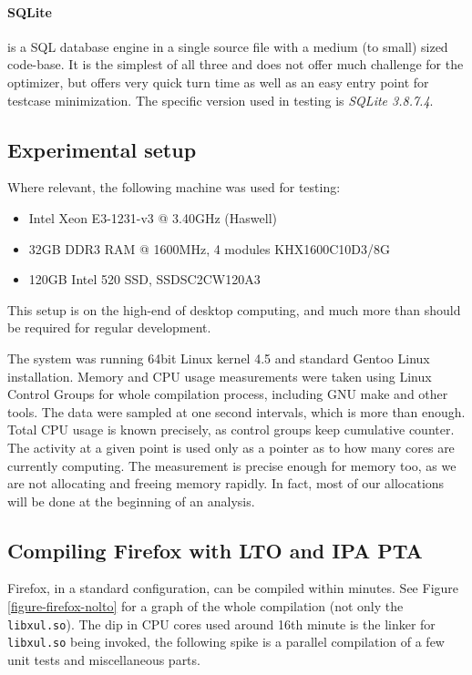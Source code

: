 \paragraph{SQLite} is a SQL database engine in a single source file with a
medium (to small) sized code-base. It is the simplest of all three and does not
offer much challenge for the optimizer, but offers very quick turn time as well
as an easy entry point for testcase minimization. The specific version used in
testing is {\it SQLite 3.8.7.4}.

\subsection{Experimental setup}

Where relevant, the following machine was used for testing:

\begin{itemize}
	\item Intel Xeon E3-1231-v3 @ 3.40GHz (Haswell)
	\item 32GB DDR3 RAM @ 1600MHz, 4 modules KHX1600C10D3/8G
	\item 120GB Intel 520 SSD, SSDSC2CW120A3
\end{itemize}

This setup is on the high-end of desktop computing, and much more than
should be required for regular development. 

The system was running 64bit Linux kernel 4.5 and standard Gentoo Linux
installation. Memory and CPU usage measurements were taken using Linux Control
Groups  for whole compilation process, including GNU make and other tools. The
data were sampled at one second intervals, which is more than enough. Total CPU
usage is known precisely, as control groups keep cumulative counter. The
activity at a given point is used only as a pointer as to how many cores are
currently computing. The measurement is precise enough for memory too, as
we are not allocating and freeing memory rapidly. In fact, most of our
allocations will be done at the beginning of an analysis.

\subsection{Compiling Firefox with LTO and IPA PTA}
\label{section-firefox-lto-pta}

Firefox, in a standard configuration, can be compiled within minutes. See Figure
\ref{figure-firefox-nolto} for a graph of the whole compilation (not only the
{\tt libxul.so}). The dip in CPU cores used around 16th minute is the linker for
{\tt libxul.so} being invoked, the following spike is a parallel compilation of a few
unit tests and miscellaneous parts.

